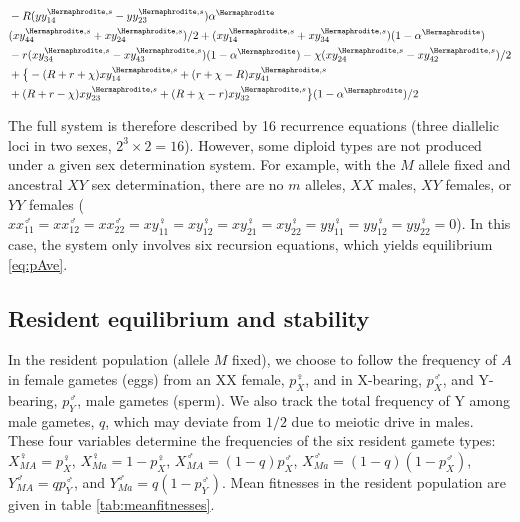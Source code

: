 \documentclass[12pt]{article}
\begin{document}
\begin{subequations}
\begin{align}
\begin{split}
&-R(yy_{14}^{\Hermaphrodite,s}-yy_{23}^{\Hermaphrodite,s}) \alpha^\Hermaphrodite\\
&(xy_{44}^{\Hermaphrodite,s}+xy_{24}^{\Hermaphrodite,s})/2+(xy_{14}^{\Hermaphrodite,s}+xy_{34}^{\Hermaphrodite,s})(1-\alpha^\Hermaphrodite)\\
&- r(xy_{34}^{\Hermaphrodite,s}-xy_{43}^{\Hermaphrodite,s})(1-\alpha^\Hermaphrodite) - \chi(xy_{24}^{\Hermaphrodite,s}-xy_{42}^{\Hermaphrodite,s})/2\\
&+\big{\{}-(R+r+\chi) xy_{14}^{\Hermaphrodite,s} + (r+\chi-R)xy_{41}^{\Hermaphrodite,s}\\
&+(R+r-\chi) xy_{23}^{\Hermaphrodite,s} + (R+\chi-r) xy_{32}^{\Hermaphrodite,s}\big{\}}(1-\alpha^\Hermaphrodite)/2
\end{split}
\end{align}
\label{eq:recursions}
\end{subequations}

\endgroup

\noindent
The full system is therefore described by 16 recurrence equations (three diallelic loci in two sexes, $2^3 \times 2 = 16$). 
However, some diploid types are not produced under a given sex determination system. 
For example, with the $M$ allele fixed and ancestral $XY$ sex determination, there are no $m$ alleles, $XX$ males, $XY$ females, or $YY$ females ($xx_{11}^{\male}=xx_{12}^{\male}=xx_{22}^\male=xy_{11}^{\female}=xy_{12}^{\female}=xy_{21}^{\female}=xy_{22}^\female=yy_{11}^{\female}=yy_{12}^{\female}=yy_{22}^\female=0$). 
In this case, the system only involves six recursion equations, %
which yields equilibrium \eqref{eq:pAve}. 


\subsection*{Resident equilibrium and stability}

In the resident population (allele $M$ fixed), we choose to follow the frequency of $A$ in female gametes (eggs) from an XX female, $p^\female_X$, and in X-bearing, $p^\male_X$, and Y-bearing, $p^\male_Y$, male gametes (sperm).
We also track the total frequency of Y among male gametes, $q$, which may deviate from $1/2$ due to meiotic drive in males. 
These four variables determine the frequencies of the six resident gamete types: $X_{MA}^{\female}=p_{X}^{\female}$, $X_{Ma}^{\female}=1-p_{X}^{\female}$, $X_{MA}^{\male}=(1-q)p_{X}^{\male}$, $X_{Ma}^{\male}=(1-q)(1-p_{X}^{\male})$, $Y_{MA}^{\male}=q p_{Y}^{\male}$, and $Y_{Ma}^{\male}=q(1-p_{Y}^{\male})$. 
Mean fitnesses in the resident population are given in table \ref{tab:meanfitnesses}.
\end{document}

